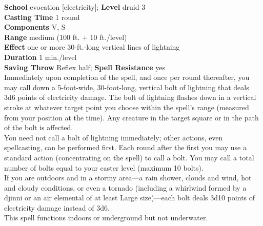 \textbf{School} evocation [electricity]; \textbf{Level} druid 3\\
\textbf{Casting Time} 1 round\\
\textbf{Components} V, S\\
\textbf{Range }medium (100 ft. + 10 ft./level)\\
\textbf{Effect} one or more 30-ft.-long vertical lines of lightning\\
\textbf{Duration} 1 min./level\\
\textbf{Saving Throw} Reflex half; \textbf{Spell Resistance} yes\\
Immediately upon completion of the spell, and once per round thereafter, you may call down a 5-foot-wide, 30-foot-long, vertical bolt of lightning that deals 3d6 points of electricity damage. The bolt of lightning flashes down in a vertical stroke at whatever target point you choose within the spell's range (measured from your position at the time). Any creature in the target square or in the path of the bolt is affected.\\
You need not call a bolt of lightning immediately; other actions, even spellcasting, can be performed first. Each round after the first you may use a standard action (concentrating on the spell) to call a bolt. You may call a total number of bolts equal to your caster level (maximum 10 bolts).\\
If you are outdoors and in a stormy area—a rain shower, clouds and wind, hot and cloudy conditions, or even a tornado (including a whirlwind formed by a djinni or an air elemental of at least Large size)—each bolt deals 3d10 points of electricity damage instead of 3d6.\\
This spell functions indoors or underground but not underwater.\\
